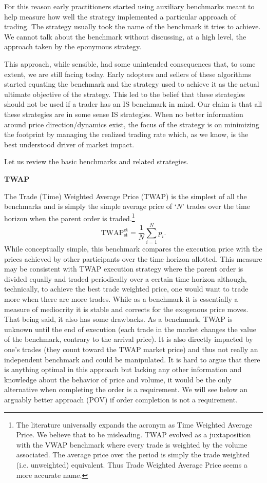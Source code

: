 For this reason early practitioners started using auxiliary benchmarks meant to help measure how well the strategy implemented a particular approach of trading. The strategy usually took the name of the benchmark it tries to achieve. We cannot talk about the benchmark without discussing, at a high level, the approach taken by the  eponymous strategy.


This approach, while sensible, had some unintended consequences that, to some extent, we are still facing today. Early adopters and sellers of these algorithms started equating the benchmark and the strategy used to achieve it as the actual ultimate objective of the strategy. This led to the belief that these strategies should not be used if a trader has an IS benchmark in mind. Our claim is that all these strategies are in some sense IS strategies. When no better information around price direction/dynamics exist, the focus of the strategy is on minimizing the footprint by managing the realized trading rate which, as we know, is the best understood driver of market impact.


Let us review the basic benchmarks and related strategies. \twomedskip


\noindent\textbf{TWAP} \twomedskip

The Trade (Time) Weighted Average Price (TWAP)  is the simplest of all the benchmarks and is simply the simple average price of `$N$' trades over the time horizon when the parent order is traded.\footnote{The literature universally  expands the acronym as Time Weighted Average Price. We believe that to be misleading. TWAP evolved as a juxtaposition with the VWAP benchmark where every trade is weighted by the volume associated. The average price over the period is simply the trade weighted (i.e. unweighted) equivalent. Thus Trade Weighted Average Price seems a more accurate name.}
        \begin{equation}
        \text{TWAP}_{\text{st}} ^{\text{et}}= \frac{1}{N}\sum_{i=1}^N{p_i}.
        \end{equation}
While conceptually simple, this benchmark compares the execution price with the prices achieved by other participants over the time horizon allotted. This measure may be consistent with TWAP execution strategy where the parent order is divided equally and traded periodically over a certain time horizon although, technically, to achieve the best trade weighted price, one would want to trade more when there are more trades. While  as a benchmark it is essentially a measure of mediocrity it is stable and corrects for the exogenous price moves. That being said, it also has some drawbacks. As a benchmark, TWAP is unknown until the end of execution (each trade in the market changes the value of the benchmark, contrary to the arrival price). It is also directly impacted by one's trades (they count toward the TWAP market price) and thus not really an independent benchmark and could be manipulated. 
It is hard to argue that there is anything optimal in this approach but lacking any other information and knowledge about the behavior of price and volume, it would be the only alternative when completing the order is a requirement. We will see below an arguably better approach (POV) if order completion is not a requirement. 


